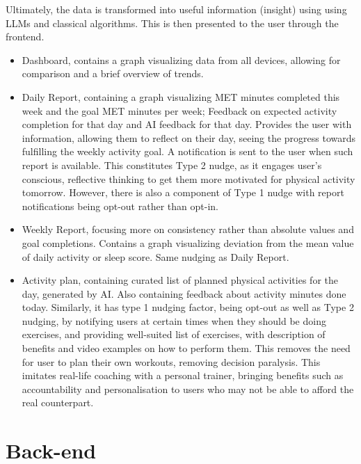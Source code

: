 Ultimately, the data is transformed into useful information (insight) using using LLMs and classical algorithms. This is then presented to the user through the frontend. 
\begin{itemize}
    \item {Dashboard, contains a graph visualizing data from all devices, allowing for comparison and a brief overview of trends.}
    \item {Daily Report, containing a graph visualizing MET minutes completed this week and the goal MET minutes per week; Feedback on expected activity completion for that day and AI feedback for that day. Provides the user with information, allowing them to reflect on their day, seeing the progress towards fulfilling the weekly activity goal. A notification is sent to the user when such report is available. This constitutes Type 2 nudge, as it  engages user's conscious, reflective thinking to get them more motivated for physical activity tomorrow. However, there is also a component of Type 1 nudge with report notifications being opt-out rather than opt-in.}
    \item {Weekly Report, focusing more on consistency rather than absolute values and goal completions. Contains a graph visualizing deviation from the mean value of daily activity or sleep score. Same nudging as Daily Report.}
    \item {Activity plan, containing curated list of planned physical activities for the day, generated by AI. Also containing feedback about activity minutes done today. Similarly, it has type 1 nudging factor, being opt-out as well as Type 2 nudging, by notifying users at certain times when they should be doing exercises, and providing well-suited list of exercises, with description of benefits and video examples on how to perform them. This removes the need for user to plan their own workouts, removing decision paralysis. This imitates real-life coaching with a personal trainer, bringing benefits such as accountability and personalisation to users who may not be able to afford the real counterpart.}
\end{itemize}

\section{Back-end}
